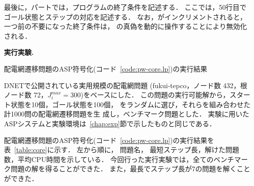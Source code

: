 最後に，パートでは，プログラムの終了条件を記述する．
ここでは，50行目でゴール状態とステップの対応を記述する．
なお，がインクリメントされると，一つ前の不要になった終了条件は，
の真偽を動的に操作することにより無効化される．

\textbf{実行実験.}
\begin{table*}[t]
  \centering
  \caption{配電網遷移問題のASP符号化(コード~\ref{code:pw-core.lp})の実行結果}
  \label{table:core}
  
\end{table*}
%
DNETで公開されている実用規模の配電網問題
({\sf fukui-tepco}，ノード数 432，根ノード数 72，$J_i^{max}=300$)をベースにした．
この問題の実行可能解から，スタート状態を10個，ゴール状態を100個，
をランダムに選び，それらを組み合わせた計1000問の配電網遷移問題を生
成し，ベンチマーク問題とした．
実験に用いたASPシステムと実験環境は~\ref{chap:exp}節で示したものと同じである．

配電網遷移問題のASP符号化(コード~\ref{code:pw-core.lp})の実行結果を
表~\ref{table:core}に示す．
左から順に，
問題名，
最短ステップ長，解けた問題数，平均CPU時間を示している．
今回行った実行実験では，全てのベンチマーク問題の解を得ることができた．
また，最長でステップ長が7の問題を解くことができた．






